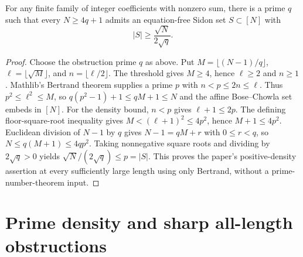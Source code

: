 \begin{theorem}
\label{construction:dense-modular-obstruction}
\leanok
For any finite family of integer coefficients with nonzero sum, there is
a prime $q$ such that every $N\ge4q+1$ admits an equation-free Sidon set
$S\subset[N]$ with
\[
 |S|\ge\frac{\sqrt N}{2\sqrt q}.
\]
\end{theorem}
\begin{proof}
Choose the obstruction prime $q$ as above.  Put
$M=\lfloor(N-1)/q\rfloor$, $\ell=\lfloor\sqrt M\rfloor$, and
$n=\lfloor\ell/2\rfloor$.
The threshold gives $M\ge4$, hence $\ell\ge2$ and $n\ge1$.
Mathlib's Bertrand theorem supplies a prime $p$ with
$n<p\le2n\le\ell$.
Thus $p^2\le\ell^2\le M$, so
$q(p^2-1)+1\le qM+1\le N$ and the affine Bose--Chowla set embeds in
$[N]$.
For the density bound, $n<p$ gives $\ell+1\le2p$.
The defining floor-square-root inequality gives
$M<(\ell+1)^2\le4p^2$, hence $M+1\le4p^2$.
Euclidean division of $N-1$ by $q$ gives
$N-1=qM+r$ with $0\le r<q$, so $N\le q(M+1)\le4qp^2$.
Taking nonnegative square roots and dividing by $2\sqrt q>0$ yields
$\sqrt N/(2\sqrt q)\le p=|S|$.
This proves the paper's positive-density assertion at every sufficiently
large length using only Bertrand, without a prime-number-theorem input.
\end{proof}


\section{Prime density and sharp all-length obstructions}

